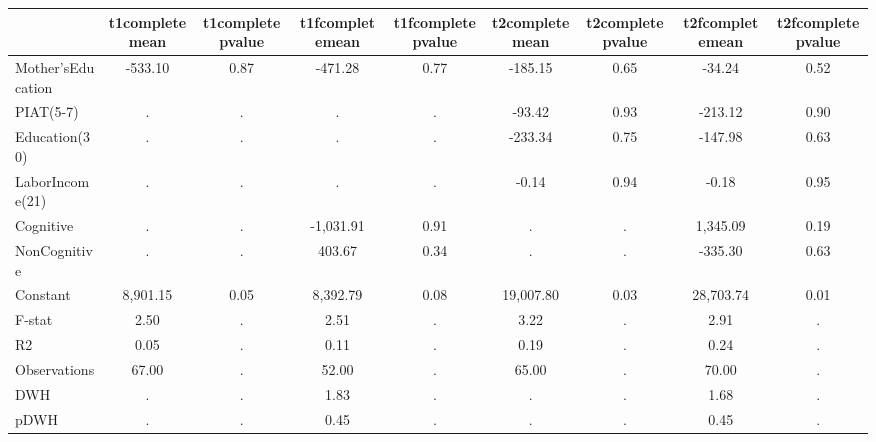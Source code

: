 \begin{table}[htbp]
\begin{tabular}{lcccccccc} \hline \hline
 & t1completemean  & t1completepvalue  & t1fcompletemean  & t1fcompletepvalue  & t2completemean  & t2completepvalue  & t2fcompletemean  & t2fcompletepvalue  \\  \hline 
Mother'sEducation &      -533.10 &         0.87 &      -471.28 &         0.77 &      -185.15 &         0.65 &       -34.24 &         0.52 \\  
PIAT(5-7) &            . &            . &            . &            . &       -93.42 &         0.93 &      -213.12 &         0.90 \\  
Education(30) &            . &            . &            . &            . &      -233.34 &         0.75 &      -147.98 &         0.63 \\  
LaborIncome(21) &            . &            . &            . &            . &        -0.14 &         0.94 &        -0.18 &         0.95 \\  
Cognitive &            . &            . &    -1,031.91 &         0.91 &            . &            . &     1,345.09 &         0.19 \\  
NonCognitive &            . &            . &       403.67 &         0.34 &            . &            . &      -335.30 &         0.63 \\  
Constant &     8,901.15 &         0.05 &     8,392.79 &         0.08 &    19,007.80 &         0.03 &    28,703.74 &         0.01 \\  
F-stat &         2.50 &            . &         2.51 &            . &         3.22 &            . &         2.91 &            . \\  
R2 &         0.05 &            . &         0.11 &            . &         0.19 &            . &         0.24 &            . \\  
Observations &        67.00 &            . &        52.00 &            . &        65.00 &            . &        70.00 &            . \\  
DWH &            . &            . &         1.83 &            . &            . &            . &         1.68 &            . \\  
pDWH &            . &            . &         0.45 &            . &            . &            . &         0.45 &            . \\  
\hline \hline \end{tabular}
\end{table}
